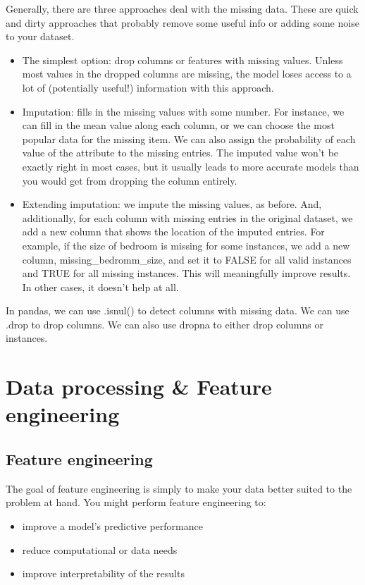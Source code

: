 \documentclass[12pt]{report}
\begin{document}
Generally, there are three approaches deal with the missing data. These are quick and dirty approaches that probably remove some useful info or adding some noise to your dataset.
\begin{itemize}
  \item The simplest option: drop columns or features with missing values. Unless most values in the dropped columns are missing, the model loses access to a lot of (potentially useful!) information with this approach.
  \item Imputation: fills in the missing values with some number. For instance, we can fill in the mean value along each column, or we can choose the most popular data for the missing item. We can also assign the probability of each value of the attribute to the missing entries. The imputed value won't be exactly right in most cases, but it usually leads to more accurate models than you would get from dropping the column entirely.
  \item Extending imputation: we impute the missing values, as before. And, additionally, for each column with missing entries in the original dataset, we add a new column that shows the location of the imputed entries. For example, if the size of bedroom is missing for some instances, we add a new column, missing\_bedromm\_size, and set it to FALSE for all valid instances and TRUE for all missing instances. This will meaningfully improve results. In other cases, it doesn't help at all.
\end{itemize}

In pandas, we can use .isnul() to detect columns with missing data. We can use .drop to drop columns. We can also use dropna to either drop columns or instances.

\section{Data processing \& Feature engineering}

\subsection{Feature engineering}
The goal of feature engineering is simply to make your data better suited to the problem at hand. You might perform feature engineering to:
\begin{itemize}
  \item improve a model's predictive performance
  \item reduce computational or data needs
  \item improve interpretability of the results
\end{itemize}
\end{document}
